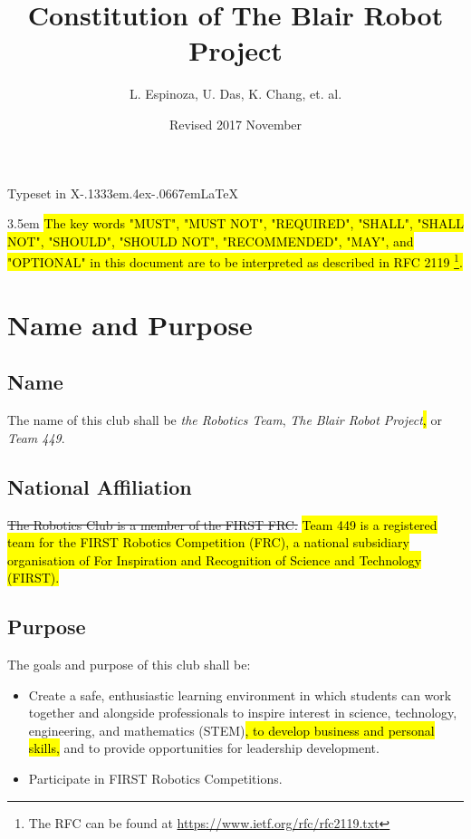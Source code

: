 \documentclass[12pt, a4paper]{article}
\title{Constitution of The Blair Robot Project}
\author{L. Espinoza, U. Das, K. Chang, et. al.}
\affil{Montgomery Blair High School\\ Silver Spring, Maryland}
\date{Revised 2017 November}
\begin{document}
\maketitle
\thispagestyle{empty}
\begin{center}
Typeset in X\kern-.1333em\lower.4ex\hbox{}\kern-.0667em\LaTeX \hspace{.3em}%
\end{center}
\clearpage
\begin{center}
\begingroup
\leftskip3.5em
\rightskip\leftskip
\hl{
The key words "MUST", "MUST NOT", "REQUIRED", "SHALL", "SHALL
      NOT", "SHOULD", "SHOULD NOT", "RECOMMENDED",  "MAY", and
      "OPTIONAL" in this document are to be interpreted as described in
      RFC 2119 \footnote{The RFC can be found at \url{https://www.ietf.org/rfc/rfc2119.txt}}.}
\par
\endgroup
\end{center}

\section{Name and Purpose}
\subsection{Name}
The name of this club shall be \textit{the Robotics Team}, \textit{The Blair Robot Project}\hl{,} or \textit{Team 449}.
\subsection{National Affiliation}
\st{The Robotics Club is a member of the FIRST FRC.} \hl{Team 449 is a registered team for the FIRST Robotics Competition (FRC), a national subsidiary organisation of For Inspiration and Recognition of Science and Technology (FIRST).} 
\subsection{Purpose}
The goals and purpose of this club shall be:
\begin{itemize}
\item Create a safe, enthusiastic learning environment in which students can work together and alongside professionals to inspire interest in science, technology, engineering, and mathematics (STEM)\hl{, to develop business and personal skills,} and to provide opportunities for leadership development.
\item Participate in FIRST Robotics Competitions.
\end{itemize}
\end{document}
